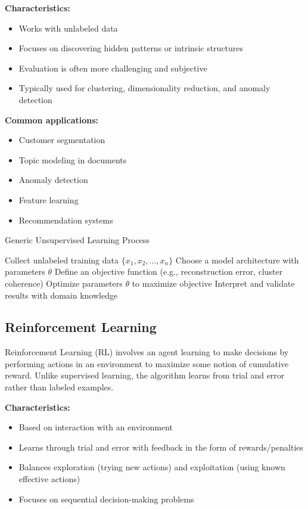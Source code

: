 \documentclass[11pt,a4paper]{report}
\begin{document}
\textbf{Characteristics:}
\begin{itemize}
    \item Works with unlabeled data
    \item Focuses on discovering hidden patterns or intrinsic structures
    \item Evaluation is often more challenging and subjective
    \item Typically used for clustering, dimensionality reduction, and anomaly detection
\end{itemize}

\textbf{Common applications:}
\begin{itemize}
    \item Customer segmentation
    \item Topic modeling in documents
    \item Anomaly detection
    \item Feature learning
    \item Recommendation systems
\end{itemize}

\begin{algorithm}
\caption{Generic Unsupervised Learning Process}
\begin{algorithmic}[1]
\STATE Collect unlabeled training data $\{x_1, x_2, ..., x_n\}$
\STATE Choose a model architecture with parameters $\theta$
\STATE Define an objective function (e.g., reconstruction error, cluster coherence)
\STATE Optimize parameters $\theta$ to maximize objective
\STATE Interpret and validate results with domain knowledge
\end{algorithmic}
\end{algorithm}

\subsection{Reinforcement Learning}
Reinforcement Learning (RL) involves an agent learning to make decisions by performing actions in an environment to maximize some notion of cumulative reward. Unlike supervised learning, the algorithm learns from trial and error rather than labeled examples.

\textbf{Characteristics:}
\begin{itemize}
    \item Based on interaction with an environment
    \item Learns through trial and error with feedback in the form of rewards/penalties
    \item Balances exploration (trying new actions) and exploitation (using known effective actions)
    \item Focuses on sequential decision-making problems
\end{itemize}
\end{document}
